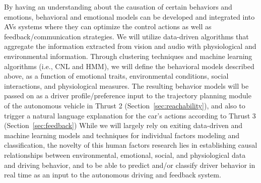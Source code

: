 By having an understanding about the causation of certain behaviors and emotions, behavioral and emotional models can be developed and integrated into AVs systems where they can optimize the control actions as well as feedback/communication strategies.
We will utilize data-driven algorithms that aggregate the information extracted from vision and audio with physiological and environmental information. Through clustering techniques and machine learning algorithms (i.e., CNL and HMM), we will define the behavioral models described above, as a function of emotional traits, environmental conditions, social interactions, and physiological measures.%
The resulting behavior models will be passed on as a driver profile/preference input to the trajectory planning module of the autonomous vehicle in Thrust 2 (Section~\ref{sec:reachability}), and also to trigger a natural language explanation for the car's actions according to Thrust 3 (Section~\ref{sec:feedback})
While we will largely rely on exiting data-driven and machine learning models and techniques for individual factors modeling and classification, the novelty of this human factors research lies in establishing causal relationships between environmental, emotional, social, and physiological data and driving behavior, and to be able to predict and/or classify driver behavior in real time as an input to the autonomous driving and feedback system.




 

 
 


